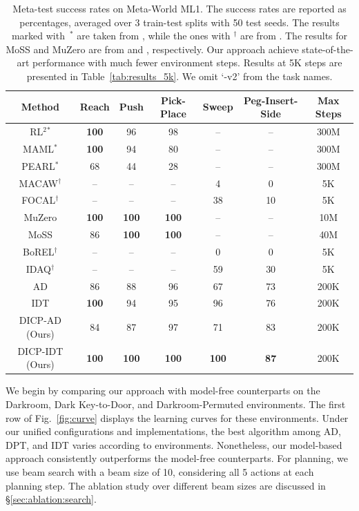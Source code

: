 \documentclass{article}
\begin{document}
\begin{table}[t]
    \caption{Meta-test success rates on Meta-World ML1.
    The success rates are reported as percentages, averaged over 3 train-test splits with 50 test seeds.
    The results marked with~$^*$ are taken from \citet{MW}, while the ones with $^\dag$ are from \citet{IDAQ}.
    The results for MoSS and MuZero are  from \citet{MoSS} and \cite{ProcGenMuZero}, respectively.
    Our approach achieve state-of-the-art performance with much fewer environment steps.
    Results at 5K steps are presented in Table~\ref{tab:results_5k}.
    We omit `-v2' from the task names.
    }
    \label{tab:results}
    \small \centering
    \begin{tabular}{ccccccc}
    \toprule
    Method & Reach & Push & Pick-Place & Sweep & Peg-Insert-Side & Max Steps\\
    \midrule
    RL$^2$$^*$ & \textbf{100} & 96 & 98 & -- & -- & 300M\\
    MAML$^*$ & \textbf{100} & 94 & 80 & --  & -- & 300M\\
    PEARL$^*$ & 68 & 44 & 28 & -- & -- & 300M\\
    MACAW$^\dag$ & -- & -- & -- & 4 & 0 & 5K\\
    FOCAL$^\dag$ & -- & -- & -- & 38 & 10 & 5K\\
    \midrule
    MuZero & \textbf{100} & \textbf{100} & \textbf{100} & -- & -- & 10M\\
    MoSS & 86 & \textbf{100} & \textbf{100} & -- & -- & 40M\\
    BoREL$^\dag$ & -- & -- & -- & 0 & 0 & 5K\\
    IDAQ$^\dag$ & -- & -- & -- & 59 & 30 & 5K\\
    \midrule
    AD & 86 & 88 & 96 & 67 & 73 & 200K\\
    IDT & \textbf{100} & 94 & 95 & 96 & 76 & 200K\\
    \midrule
    DICP-AD (Ours) & 84 & 87 & 97 & 71 & 83 & 200K\\
    DICP-IDT (Ours) & \textbf{100} & \textbf{100} & \textbf{100} & \textbf{100} & \textbf{87} & 200K \\
    \bottomrule
    \end{tabular}
\end{table}

We begin by comparing our approach with model-free counterparts on the Darkroom, Dark Key-to-Door, and Darkroom-Permuted environments.
The first row of Fig.~\ref{fig:curve} displays the learning curves for these environments.
Under our unified configurations and implementations, the best algorithm among AD, DPT, and IDT varies according to environments.
Nonetheless, our model-based approach consistently outperforms the model-free counterparts.
For planning, we use beam search with a beam size of 10, considering all 5 actions at each planning step.
The ablation study over different beam sizes are discussed in \S\ref{sec:ablation:search}.
\end{document}

